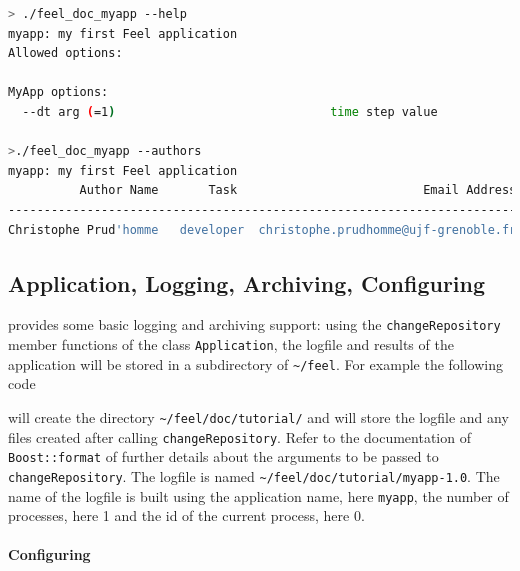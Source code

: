 \begin{lstlisting}[language=sh]
> ./feel_doc_myapp --help
myapp: my first Feel application
Allowed options:

MyApp options:
  --dt arg (=1)                              time step value

>./feel_doc_myapp --authors
myapp: my first Feel application
          Author Name       Task                          Email Address
-----------------------------------------------------------------------
Christophe Prud'homme   developer  christophe.prudhomme@ujf-grenoble.fr
\end{lstlisting}

\subsection{Application, Logging, Archiving, Configuring}
\label{sec:appl-logg-arch}

\feel provides some basic logging and archiving support: using the
\lstinline!changeRepository! member functions of the class
\lstinline!Application!, the logfile and results of the application
will be stored in a subdirectory of \lstinline!~/feel!. For
example the following code



will create the directory \lstinline!~/feel/doc/tutorial/! and will store the
logfile and any files created after calling
\lstinline!changeRepository!. Refer to the documentation of
\lstinline!Boost::format! of further details about the arguments to be
passed to \lstinline!changeRepository!. The logfile is named
\lstinline!~/feel/doc/tutorial/myapp-1.0!. The name of the logfile is built
using the application name, here \lstinline!myapp!, the number of
processes, here 1 and the id of the current process, here 0.

\paragraph{Configuring}

